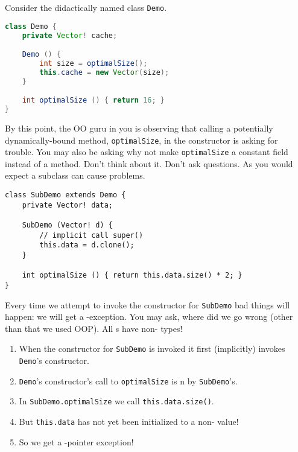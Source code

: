 \documentclass{article}
\begin{document}
\begin{example}
  Consider the didactically named class \texttt{Demo}.
\begin{lstlisting}[escapechar=|, language=Java]
class Demo {
    private Vector! cache;

    Demo () {
        int size = optimalSize();
        this.cache = new Vector(size);
    }

    int optimalSize () { return 16; }
}
\end{lstlisting}
  By this point, the OO guru in you is observing that calling a potentially dynamically-bound method, \texttt{optimalSize}, in the constructor is asking for trouble.
  You may also be asking why not make \texttt{optimalSize} a constant field instead of a method.
  Don't think about it.
  Don't ask questions.
  As you would expect a subclass can cause problems.
\begin{lstlisting}
class SubDemo extends Demo {
    private Vector! data;

    SubDemo (Vector! d) {
        // implicit call super()
        this.data = d.clone();
    }

    int optimalSize () { return this.data.size() * 2; }
}
\end{lstlisting}
  Every time we attempt to invoke the constructor for \texttt{SubDemo} bad things will happen: we will get a \cringe{}-exception.
  You may ask, where did we go wrong (other than that we used OOP).
  All \receiver{}s have non-\cringe{} types!
  \begin{enumerate}
  \item When the constructor for \texttt{SubDemo} is invoked it first (implicitly) invokes \texttt{Demo}'s constructor.
  \item \texttt{Demo}'s constructor's call to \texttt{optimalSize} is \overide{}n by \texttt{SubDemo}'s.
  \item In \texttt{SubDemo.optimalSize} we call \texttt{this.data.size()}.
  \item But \texttt{this.data} has not yet been initialized to a non-\cringe{} value!
  \item So we get a \cringe{}-pointer exception!
  \end{enumerate}
\end{example}
\end{document}
